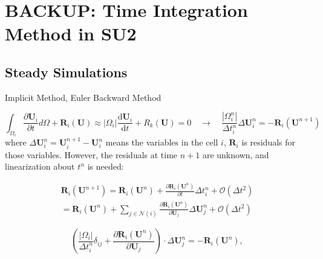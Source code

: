 \section{BACKUP: Time Integration Method in SU2}

\subsection{Steady Simulations}


\begin{frame}[allowframebreaks]{Implicit Method, Euler Backward Method}

\begin{equation}
\int_{\Omega_{i}} \frac{\partial \boldsymbol{U}_i}{\partial t} d \Omega+\boldsymbol{R}_{i}(\boldsymbol{U}) \approx\left|\Omega_{i}\right| \frac{\mathrm{d} \boldsymbol{U}_{i}}{\mathrm{d} t}+R_{k}(\boldsymbol{U})=0 \quad \rightarrow \quad \frac{\left|\Omega_{i}^{n}\right|}{\Delta t_{i}^{n}} \Delta \boldsymbol{U}_{i}^{n}=-\boldsymbol{R}_{i}\left(\boldsymbol{U}^{n+1}\right)
\end{equation}
where $\Delta \boldsymbol{U}_{i}^{n}=\boldsymbol{U}_{i}^{n+1}-\boldsymbol{U}_{i}^{n}$ means the variables in the cell $i$, $\boldsymbol{R}_i$ is residuals for those variables. However, the residuals at time $n + 1$ are unknown, and linearization about $t^n$ is
needed:

\begin{multline}
    \boldsymbol{R}_{i}\left(\boldsymbol{U}^{n+1}\right)=\boldsymbol{R}_{i}\left(\boldsymbol{U}^{n}\right)+\frac{\partial \boldsymbol{R}_{i}\left(\boldsymbol{U}^{n}\right)}{\partial t} \Delta t_{i}^{n}+\mathcal{O}\left(\Delta t^{2}\right)\\=\boldsymbol{R}_{i}\left(\boldsymbol{U}^{n}\right)+\sum_{j \in \mathcal{N}(i)} \frac{\partial \boldsymbol{R}_{i}\left(\boldsymbol{U}^{n}\right)}{\partial \boldsymbol{U}_{j}} \Delta \boldsymbol{U}_{j}^{n}+\mathcal{O}\left(\Delta t^{2}\right)
\end{multline}

\begin{equation}
\left(\frac{\left|\Omega_{i}\right|}{\Delta t_{i}^{n}} \delta_{i j}+\frac{\partial \boldsymbol{R}_{i}\left(\boldsymbol{U}^{n}\right)}{\partial \boldsymbol{U}_{j}}\right) \cdot \Delta \boldsymbol{U}_{j}^{n}=-\boldsymbol{R}_{i}\left(\boldsymbol{U}^{n}\right),
\end{equation}


\end{frame}
